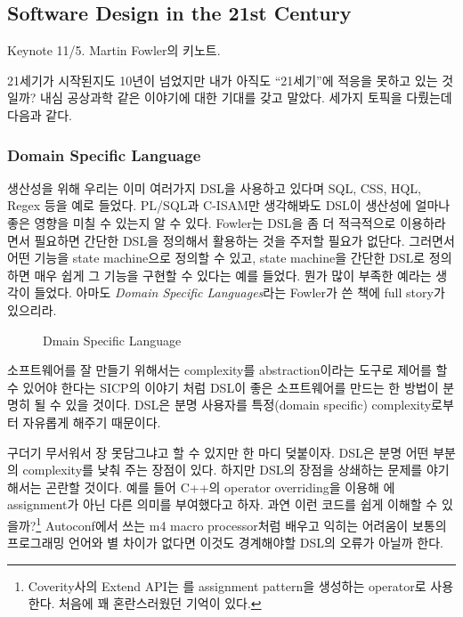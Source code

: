 \documentclass[11pt]{article}
\begin{document}
\subsection{Software Design in the 21st Century}

Keynote 11/5. Martin Fowler의 키노트.
 
21세기가 시작된지도 10년이 넘었지만 내가 아직도 ``21세기''에 적응을 못하고 
있는 것일까? 내심 공상과학 같은 이야기에 대한 기대를 갖고 말았다.
세가지 토픽을 다뤘는데 다음과 같다.
 
\subsubsection{Domain Specific Language}
 
생산성을 위해 우리는 이미 여러가지 DSL을 사용하고 있다며 SQL, CSS, HQL, Regex 
등을 예로 들었다. PL/SQL과 C-ISAM만 생각해봐도 DSL이 생산성에 얼마나 좋은 
영향을 미칠 수 있는지 알 수 있다. Fowler는 DSL을 좀 더 적극적으로 
이용하라면서 필요하면 간단한 DSL을 정의해서 활용하는 것을 주저할 필요가 
없단다. 그러면서 어떤 기능을 state machine으로 정의할 수 있고, state 
machine을 간단한 DSL로 정의하면 매우 쉽게 그 기능을 구현할 수 있다는 예를 
들었다. 뭔가 많이 부족한 예라는 생각이 들었다.
아마도 \textit{Domain Specific Languages}\cite{fowler}라는 Fowler가 쓴 책에 
full story가 있으리라.

\begin{figure}[t]
    \begin{Frame}
        \begin{center}
        \end{center}
    \end{Frame}
    \caption{Dmain Specific Language}
    \label{dsl}
\end{figure}
 
소프트웨어를 잘 만들기 위해서는 complexity를 abstraction이라는 도구로
제어를 할 수 있어야 한다는 SICP의 이야기\cite{sicp} 처럼 DSL이 좋은 
소프트웨어를 만드는 한 방법이 분명히 될 수 있을 것이다. DSL은 분명 사용자를
특정(domain specific) complexity로부터 자유롭게 해주기 때문이다.

 
구더기 무서워서 장 못담그냐고 할 수 있지만 한 마디 덪붙이자. DSL은 분명
어떤 부분의 complexity를 낮춰 주는 장점이 있다. 하지만  DSL의 장점을 상쇄하는
문제를 야기해서는 곤란할 것이다. 예를 들어 C++의 operator overriding을 이용해 
\mbtt{=}에 assignment가 아닌 다른 의미를 부여했다고 하자. 과연 이런 코드를 쉽게 
이해할 수 있을까?\footnote{Coverity사의 Extend API는 \mbtt{=}를 assignment
pattern을 생성하는 operator로 사용한다. 처음에 꽤 혼란스러웠던 기억이 있다.}
Autoconf에서 쓰는 m4 macro processor처럼 배우고 익히는 어려움이 보통의 
프로그래밍 언어와 별 차이가 없다면 이것도 경계해야할 DSL의 오류가 아닐까 한다.
\end{document}
